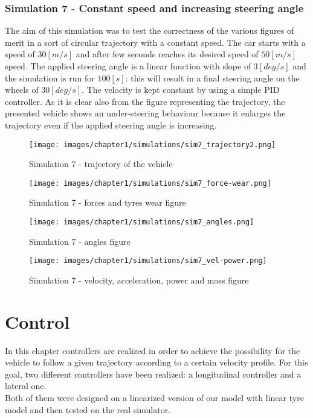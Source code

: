 \documentclass{report}
\let\Oldsubsection\subsection
\renewcommand{\subsection}{\FloatBarrier\Oldsubsection}
\begin{document}
\subsection{Simulation 7 - Constant speed and increasing steering angle}
The aim of this simulation was to test the correctness of the various figures of merit in a sort of circular trajectory with a constant speed. The car starts with a speed of $30[m/s]$ and after few seconds reaches its desired speed of $50[m/s]$ speed. The applied steering angle is a linear function with slope of $3[deg/s]$ and the simulation is run for $100[s]$: this will result in a final steering angle on the wheels of $30[deg/s]$. The velocity is kept constant by using a simple PID controller. As it is clear also from the figure representing the trajectory, the presented vehicle shows an under-steering behaviour because it enlarges the trajectory even if the applied steering angle is increasing. 
\begin{figure}[h!]
    \centering
    \texttt{[image: images/chapter1/simulations/sim7\_trajectory2.png]}
    \caption{Simulation 7 - trajectory of the vehicle}
    \label{fig:sim7_1}
\end{figure}
\begin{figure}[h!]
    \centering
    \texttt{[image: images/chapter1/simulations/sim7\_force-wear.png]}
    \caption{Simulation 7 - forces and tyres wear figure}
    \label{fig:sim7_2}
\end{figure}
\begin{figure}[h!]
    \centering
    \texttt{[image: images/chapter1/simulations/sim7\_angles.png]}
    \caption{Simulation 7 - angles figure}
    \label{fig:sim7_3}
\end{figure}
\begin{figure}[h!]
    \centering
    \texttt{[image: images/chapter1/simulations/sim7\_vel-power.png]}
    \caption{Simulation 7 - velocity, acceleration, power and mass figure}
    \label{fig:sim7_4}
\end{figure}

\clearpage
\newpage

\chapter{Control}
In this chapter controllers are realized in order to achieve the possibility for the vehicle to follow a given trajectory according to a certain velocity profile. For this goal, two different controllers have been realized: a longitudinal controller and a lateral one. 
\\Both of them were designed on a linearized version of our model with linear tyre model and then tested on the real simulator.
\end{document}
